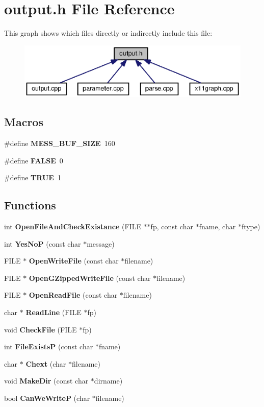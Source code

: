 \section{output.\-h File Reference}
\label{output_8h}
This graph shows which files directly or indirectly include this file\-:
\nopagebreak
\begin{figure}[H]
\begin{center}
\leavevmode
\includegraphics[width=350pt]{output_8h__dep__incl}
\end{center}
\end{figure}
\subsection*{Macros}
\begin{DoxyCompactItemize}
\item 
\#define {\bf M\-E\-S\-S\-\_\-\-B\-U\-F\-\_\-\-S\-I\-Z\-E}~160
\item 
\#define {\bf F\-A\-L\-S\-E}~0
\item 
\#define {\bf T\-R\-U\-E}~1
\end{DoxyCompactItemize}
\subsection*{Functions}
\begin{DoxyCompactItemize}
\item 
int {\bf Open\-File\-And\-Check\-Existance} (F\-I\-L\-E $\ast$$\ast$fp, const char $\ast$fname, char $\ast$ftype)
\item 
int {\bf Yes\-No\-P} (const char $\ast$message)
\item 
F\-I\-L\-E $\ast$ {\bf Open\-Write\-File} (const char $\ast$filename)
\item 
F\-I\-L\-E $\ast$ {\bf Open\-G\-Zipped\-Write\-File} (const char $\ast$filename)
\item 
F\-I\-L\-E $\ast$ {\bf Open\-Read\-File} (const char $\ast$filename)
\item 
char $\ast$ {\bf Read\-Line} (F\-I\-L\-E $\ast$fp)
\item 
void {\bf Check\-File} (F\-I\-L\-E $\ast$fp)
\item 
int {\bf File\-Exists\-P} (const char $\ast$fname)
\item 
char $\ast$ {\bf Chext} (char $\ast$filename)
\item 
void {\bf Make\-Dir} (const char $\ast$dirname)
\item 
bool {\bf Can\-We\-Write\-P} (char $\ast$filename)
\end{DoxyCompactItemize}


